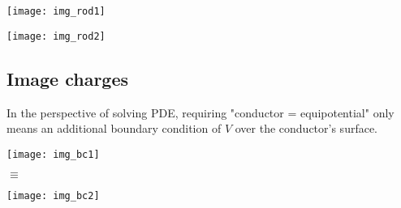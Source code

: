 \documentclass[class=article, crop=false, 12pt]{standalone}
\begin{document}
\begin{center}
    \begin{minipage}{0.25\linewidth}
        \centering
    \end{minipage}
    \begin{minipage}{0.2\linewidth}
        \centering
        \texttt{[image: img\_rod1]}
    \end{minipage}
    \hspace{0.04\textwidth}
    \vline
    \hspace{0.04\textwidth}
    \begin{minipage}{0.19\linewidth}
        \centering
        \texttt{[image: img\_rod2]}
    \end{minipage}
    \begin{minipage}{0.15\linewidth}
        \centering
    \end{minipage}
\end{center}



\subsection{Image charges}

In the perspective of solving PDE, 
requiring "conductor = equipotential" only means an additional boundary condition of $V$ over the conductor's surface.

\begin{center}
    \begin{minipage}{0.27\linewidth}
        \centering
        \texttt{[image: img\_bc1]}
    \end{minipage}
    {\Large \quad$\equiv$\quad}
    \begin{minipage}{0.27\linewidth}
        \centering
        \texttt{[image: img\_bc2]}
    \end{minipage}
\end{center}
\end{document}
